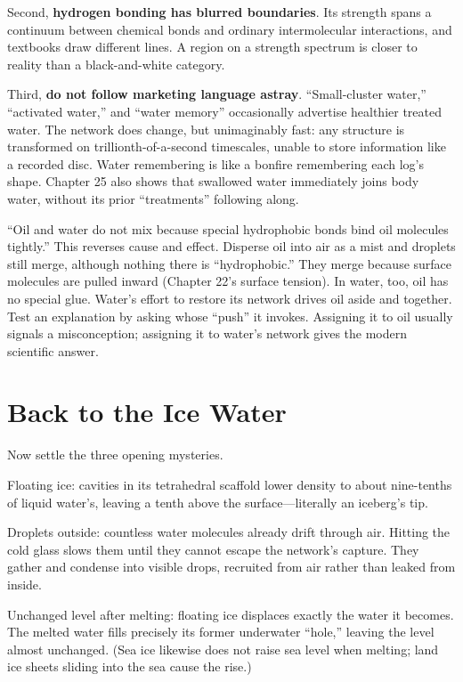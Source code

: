 Second, \textbf{hydrogen bonding has blurred boundaries}. Its strength spans a continuum between chemical bonds and ordinary intermolecular interactions, and textbooks draw different lines. A region on a strength spectrum is closer to reality than a black-and-white category.

Third, \textbf{do not follow marketing language astray}. ``Small-cluster water,'' ``activated water,'' and ``water memory'' occasionally advertise healthier treated water. The network does change, but unimaginably fast: any structure is transformed on trillionth-of-a-second timescales, unable to store information like a recorded disc. Water remembering is like a bonfire remembering each log's shape. Chapter 25 also shows that swallowed water immediately joins body water, without its prior ``treatments'' following along.

\begin{wuqu}
``Oil and water do not mix because special hydrophobic bonds bind oil molecules tightly.'' This reverses cause and effect. Disperse oil into air as a mist and droplets still merge, although nothing there is ``hydrophobic.'' They merge because surface molecules are pulled inward (Chapter 22's surface tension). In water, too, oil has no special glue. Water's effort to restore its network drives oil aside and together. Test an explanation by asking whose ``push'' it invokes. Assigning it to oil usually signals a misconception; assigning it to water's network gives the modern scientific answer.
\end{wuqu}

\section{Back to the Ice Water}

Now settle the three opening mysteries.

Floating ice: cavities in its tetrahedral scaffold lower density to about nine-tenths of liquid water's, leaving a tenth above the surface---literally an iceberg's tip.

Droplets outside: countless water molecules already drift through air. Hitting the cold glass slows them until they cannot escape the network's capture. They gather and condense into visible drops, recruited from air rather than leaked from inside.

Unchanged level after melting: floating ice displaces exactly the water it becomes. The melted water fills precisely its former underwater ``hole,'' leaving the level almost unchanged. (Sea ice likewise does not raise sea level when melting; land ice sheets sliding into the sea cause the rise.)

